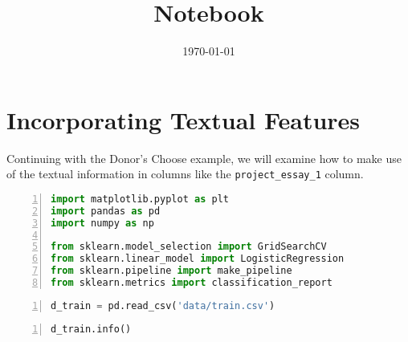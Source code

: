 \documentclass[10pt,parskip=half,
	toc=sectionentrywithdots,
	bibliography=totocnumbered,
	captions=tableheading,numbers=noendperiod]{scrartcl}
\begin{document}
		\title{Notebook}
	\date{\today}
	\maketitle

		\begingroup
    \let\cleardoublepage\relax
    \let\clearpage\relax\tableofcontents\listoffigures\listoftables{}
    \endgroup

\section{Incorporating Textual
Features}\label{incorporating-textual-features}

Continuing with the Donor's Choose example, we will examine how to make
use of the textual information in columns like the
\texttt{project\_essay\_1} column.

\begin{lstlisting}[language=Python,numbers=left,xleftmargin=20pt,xrightmargin=5pt,belowskip=5pt,aboveskip=5pt]
%matplotlib inline
import matplotlib.pyplot as plt
import pandas as pd
import numpy as np

from sklearn.model_selection import GridSearchCV
from sklearn.linear_model import LogisticRegression
from sklearn.pipeline import make_pipeline
from sklearn.metrics import classification_report
\end{lstlisting}

\begin{lstlisting}[language=Python,numbers=left,xleftmargin=20pt,xrightmargin=5pt,belowskip=5pt,aboveskip=5pt]
d_train = pd.read_csv('data/train.csv')
\end{lstlisting}

\begin{lstlisting}[language=Python,numbers=left,xleftmargin=20pt,xrightmargin=5pt,belowskip=5pt,aboveskip=5pt]
d_train.info()
\end{lstlisting}
\end{document}
